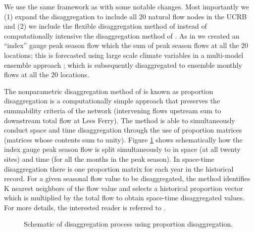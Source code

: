\documentclass[final,5p,times,twocolumn,authoryear]{elsarticle}
\begin{document}
We use the same framework as \cite[see their section 4]{Bracken:2010cw} with some notable changes. Most importantly we (1) expand the disaggregation to include all 20 natural flow nodes in the UCRB and (2) we include the flexible disaggregation method of \cite{Nowak:2010ha} instead of computationally intensive the disaggregation method of \cite{Prairie:2007jf}.  As in \cite{Bracken:2010cw} we created an ``index'' gauge peak season flow which the sum of peak season flows at all the 20 locations; this is forecasted using large scale climate variables in a multi-model ensemble approach \cite{Bracken:2010cw,Regonda2006}; which is subsequently disaggregated to ensemble monthly flows at all the 20 locations.  

The nonparametric disaggregation method of \cite{Nowak:2010ha} is known as proportion disaggregation is a computationally simple approach that preserves the summability criteria of the network (intervening flows upstream sum to downstream total flow at Lees Ferry). The method is able to simultaneously conduct space and time disaggregation through the use of proportion matrices (matrices whose contents sum to unity). Figure \ref{fig:disag} shows schematically how the index gauge peak season flow is split simultaneously to in space (at all twenty sites) and time (for all the months in the peak season). In space-time disaggregation there is one proportion matrix for each year in the historical record.  For a given seasonal flow value to be disaggregated, the method identifies K nearest neighbors of the flow value and selects a historical proportion vector which is multiplied by the total flow to obtain space-time disaggregated values. For more details, the interested reader is referred to \cite{Nowak:2010ha}.

\begin{figure}[htbp] %
   \centering
   
   \caption{Schematic of disaggregation process using proportion disaggregation.}
   \label{fig:disag}
\end{figure}
\end{document}
